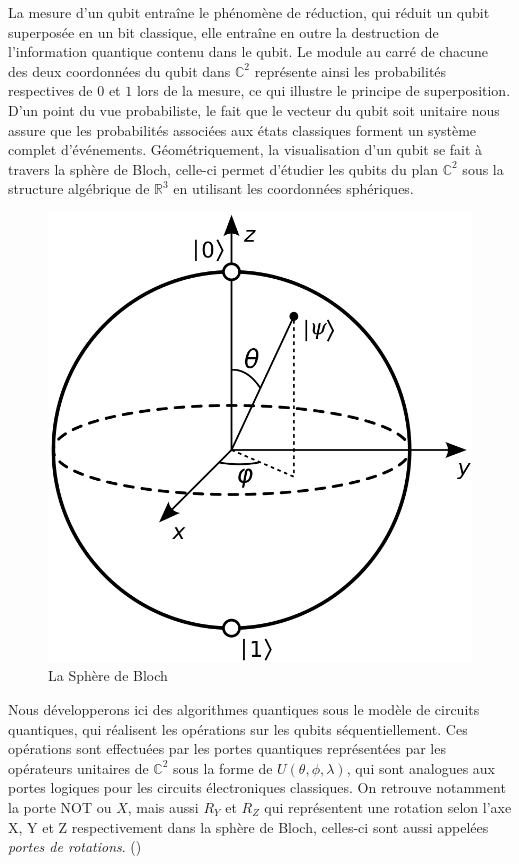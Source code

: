 \noindent La mesure d’un qubit entraîne le phénomène de réduction, qui réduit un qubit superposée en un bit classique, elle entraîne en outre la destruction de l’information quantique contenu dans le qubit. Le module au carré de chacune des deux coordonnées du qubit dans \(\mathbb{C}^2 \) représente ainsi les probabilités respectives de \(0\) et \(1\) lors de la mesure, ce qui illustre le principe de superposition. D’un point du vue probabiliste, le fait que le vecteur du qubit soit unitaire nous assure que les probabilités associées aux états classiques forment un système complet d'événements. Géométriquement, la visualisation d’un qubit se fait à travers la sphère de Bloch, celle-ci permet d’étudier les qubits du plan \(\mathbb{C}^2 \) sous la structure algébrique de \(\mathbb{R}^3 \) en utilisant les coordonnées sphériques. 
\\
\begin{figure}
\centering
\includegraphics[scale=0.15]{Bloch_sphere.png}
\caption{La Sphère de Bloch}
\label{fig:Bloch}
\end{figure}
\noindent Nous développerons ici des algorithmes quantiques sous le modèle de circuits quantiques, qui réalisent les opérations sur les qubits séquentiellement. Ces opérations sont effectuées par les portes quantiques représentées par les opérateurs unitaires de \(\mathbb{C}^2 \) sous la forme de \(U(\theta, \phi, \lambda)\), qui sont analogues aux portes logiques pour les circuits électroniques classiques. On retrouve notamment la porte NOT ou \(X\), mais aussi \(R_Y\) et \(R_Z\) qui représentent une rotation selon l’axe X, Y et Z respectivement dans la sphère de Bloch, celles-ci sont aussi appelées \textit{portes de rotations}. (\cite{quant_rep_BN})

